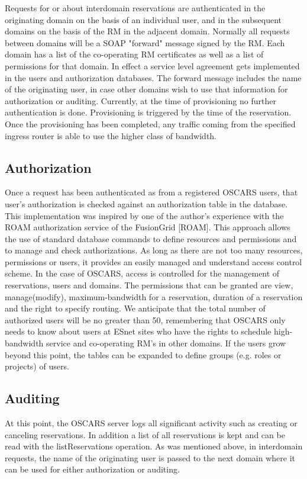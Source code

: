 \documentclass[conference]{IEEEtran}
\begin{document}
Requests for or about interdomain
reservations are authenticated in the originating domain on the basis
of an individual user, and in the subsequent domains on the basis of
the RM in the adjacent domain. Normally all requests
between domains will be a SOAP "forward"  message
signed by the RM. Each domain has a list of the
co-operating RM certificates as well as a list of
permissions for that domain. In effect a service level agreement gets
implemented in the users and authorization databases. The forward
message includes the name of the originating user, in case other
domains wish to use that information for authorization or auditing.
Currently, at the time of provisioning no further authentication is
done. Provisioning is triggered by the time of the reservation. Once
the provisioning has been completed, any traffic coming from the
specified ingress router is able to use the higher class of bandwidth.

\subsection{Authorization}
Once a request has been authenticated as from a registered OSCARS
users, that user's authorization is checked against an authorization
table in the database. This implementation was inspired by one of the
author's experience with the ROAM authorization service of the
FusionGrid [ROAM]. This approach allows the use of standard database
commands to define resources and permissions and to manage and check
authorizations. As long as there are not too many resources,
permissions or users, it provides an easily managed and understand
access control scheme. In the case of OSCARS,  access  is controlled for 
the management of reservations, users and domains. The permissions that can
be granted are view, manage(modify), maximum-bandwidth for a
reservation, duration of a reservation and the right to specify
routing.  We anticipate that the total number of authorized users will
be no greater than 50, remembering that OSCARS only needs to know
about users at ESnet sites who have the rights to schedule
high-bandwidth service and co-operating RM's in other
domains. If the users grow beyond this point, the tables can be
expanded to define groups (e.g. roles or projects) of users.

\subsection{Auditing}
At this point, the OSCARS server logs all significant activity such as
creating or canceling reservations. In addition a list of all
reservations is kept and can be read with the listReservations
operation. As was mentioned above, in interdomain requests, the name
of the originating user is passed to the next domain where it can be
used for either authorization or auditing.
\end{document}
